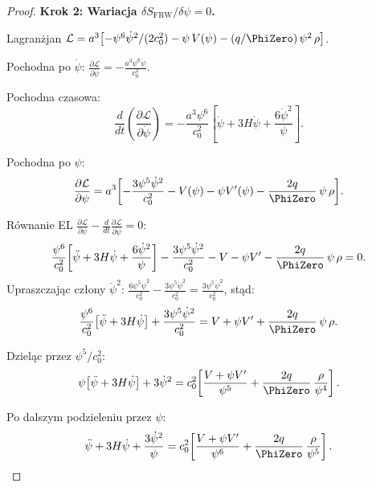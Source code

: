 \begin{proof}
\medskip\noindent\textbf{Krok 2: Wariacja $\delta S_{\mathrm{FRW}}/\delta\psi = 0$.}

Lagran\.zjan $\mathcal{L} = a^3\bigl[
  -\psi^6\dot\psi^2/(2c_0^2)
  - \psi\,V(\psi)
  - (q/\PhiZero)\,\psi^2\,\rho
\bigr]$.

Pochodna po $\dot\psi$:
$\frac{\partial\mathcal{L}}{\partial\dot\psi}
= -\frac{a^3\psi^6\dot\psi}{c_0^2}$.

Pochodna czasowa:
\begin{equation}\label{eq:ddt-pdotpsi}
  \frac{d}{dt}\!\left(\frac{\partial\mathcal{L}}{\partial\dot\psi}\right)
  = -\frac{a^3\psi^6}{c_0^2}
  \left[\ddot\psi + 3H\dot\psi + \frac{6\dot\psi^2}{\psi}\right].
\end{equation}

Pochodna po $\psi$:
\begin{equation}\label{eq:dpsi-direct}
  \frac{\partial\mathcal{L}}{\partial\psi}
  = a^3\biggl[
    -\frac{3\psi^5\dot\psi^2}{c_0^2}
    - V(\psi) - \psi V'(\psi)
    - \frac{2q}{\PhiZero}\,\psi\,\rho
  \biggr].
\end{equation}

R\'ownanie EL $\frac{\partial\mathcal{L}}{\partial\psi}
- \frac{d}{dt}\frac{\partial\mathcal{L}}{\partial\dot\psi} = 0$:
\begin{equation}\label{eq:EL-FRW-full}
  \frac{\psi^6}{c_0^2}\!\left[\ddot\psi + 3H\dot\psi
    + \frac{6\dot\psi^2}{\psi}\right]
  - \frac{3\psi^5\dot\psi^2}{c_0^2}
  - V - \psi V'
  - \frac{2q}{\PhiZero}\,\psi\,\rho
  = 0.
\end{equation}
Upraszczaj\k{a}c cz\l{}ony $\dot\psi^2$:
$\frac{6\psi^5\dot\psi^2}{c_0^2} - \frac{3\psi^5\dot\psi^2}{c_0^2}
= \frac{3\psi^5\dot\psi^2}{c_0^2}$,
st\k{a}d:
\begin{equation}\label{eq:EL-FRW-simplified}
  \frac{\psi^6}{c_0^2}\!\left[\ddot\psi + 3H\dot\psi\right]
  + \frac{3\psi^5\dot\psi^2}{c_0^2}
  = V + \psi V'
  + \frac{2q}{\PhiZero}\,\psi\,\rho.
\end{equation}

Dziel\k{a}c przez $\psi^5/c_0^2$:
\begin{equation}\label{eq:EL-FRW-divided}
  \psi\!\left[\ddot\psi + 3H\dot\psi\right]
  + 3\dot\psi^2
  = c_0^2\!\left[
    \frac{V + \psi V'}{\psi^5}
    + \frac{2q}{\PhiZero}\,\frac{\rho}{\psi^4}
  \right].
\end{equation}

Po dalszym podzieleniu przez $\psi$:
\begin{equation}\label{eq:psi-eq-unified}
  \ddot\psi + 3H\dot\psi + \frac{3\dot\psi^2}{\psi}
  = c_0^2\!\left[
    \frac{V + \psi V'}{\psi^6}
    + \frac{2q}{\PhiZero}\,\frac{\rho}{\psi^5}
  \right].
\end{equation}


\end{proof}
